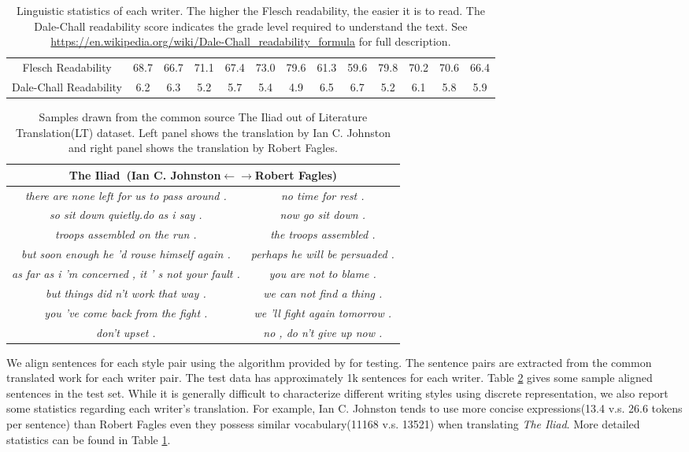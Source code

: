 \begin{table}[!th]
\begin{tabular}{c|cccccccccccc}
		Flesch Readability &68.7 &66.7 &71.1 &67.4 &73.0 &79.6 &61.3 &59.6 &79.8 &70.2 &70.6 &66.4\\
		Dale-Chall Readability &6.2 &6.3 &5.2 &5.7 &5.4 &4.9 &6.5 &6.7 &5.2 &6.1 &5.8 &5.9 \\
		\hline
	\end{tabular}
	\caption{Linguistic statistics of each writer. The higher the Flesch readability, the easier it is to read. The Dale-Chall readability score indicates the grade level required to understand the text. See \url{https://en.wikipedia.org/wiki/Dale-Chall_readability_formula} for full description.}\label{tb:stats}
\end{table}
\begin{table}[!th]
	\centering
	\small
	\begin{tabular}{c|c}
		\hline
		\multicolumn{2}{c}{\textbf{The Iliad}~(Ian C. Johnston$\leftarrow$$\rightarrow$Robert Fagles)}\\
		\hline
		\emph{there are none left for us to pass around .} & \emph{no time for rest .} \\
		\emph{so sit down quietly.do as i say .} & \emph{now go sit down .} \\
		\emph{troops assembled on the run .} & \emph{ the troops assembled .} \\
		\emph{but soon enough he 'd rouse himself again .} & \emph{perhaps he will be persuaded .} \\
		\emph{as far as i 'm concerned , it ’ s not your fault .} & \emph{you are not to blame .} \\
		\emph{but things did n't work that way .} & \emph{we can not find a thing .} \\
		\emph{you 've come back from the fight .} & \emph{we 'll fight again tomorrow .} \\
		\emph{don't upset .} & \emph{no , do n't give up now .} \\
		\hline
	\end{tabular}
	\caption{Samples drawn from the common source The Iliad out of Literature Translation(LT) dataset. Left panel shows the translation by Ian C. Johnston and right panel shows the translation by Robert Fagles.}
	\label{table:LT}
\end{table}
We align sentences for each style pair using the algorithm provided by \citet{chen2019align} for testing. The sentence pairs are extracted from the common translated work for each writer pair. The test data has approximately 1k sentences for each writer. Table \ref{table:LT} gives some sample aligned sentences in the test set. While it is generally difficult to characterize different writing styles using discrete representation, we also report some statistics regarding each writer's translation. For example, Ian C. Johnston tends to use more concise expressions(13.4 v.s. 26.6 tokens per sentence) than Robert Fagles even they possess similar vocabulary(11168 v.s. 13521) when translating \textit{The Iliad}. More detailed statistics can be found in Table \ref{tb:stats}.
